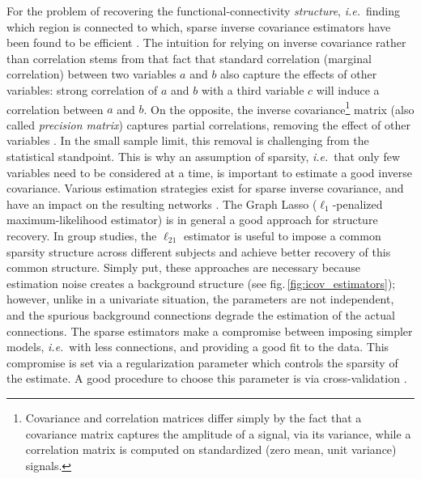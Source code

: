 \documentclass[5p]{elsarticle}
\begin{document}
For the problem of recovering the functional-connectivity
\emph{structure}, \emph{i.e.}\ finding which region is connected to
which, sparse inverse covariance estimators have been found to be
efficient \cite{varoquaux2010c,smith2011,ryali2012}. The intuition for relying on
inverse covariance rather than correlation stems from that fact that
standard correlation (marginal correlation) between two variables $a$ and
$b$ also capture the effects of other variables: strong correlation of
$a$ and $b$ with a third variable $c$ will induce a correlation between
$a$ and $b$. On the opposite, the inverse covariance\footnote{Covariance
and correlation matrices differ simply by the fact that a covariance
matrix captures the amplitude of a signal, via its variance, while a
correlation matrix is computed on standardized (zero mean, unit variance) signals.}
matrix (also called \emph{precision matrix}) captures
partial correlations, removing the effect of other variables
\cite{marrelec2006a}. In the small sample limit, this removal is
challenging from the statistical standpoint. This is why an assumption 
of sparsity,
\emph{i.e.}\ that only few variables need to be considered at a time, is
important to estimate a good inverse covariance. Various estimation
strategies exist for sparse inverse covariance, and have an impact on the
resulting networks \cite{varoquaux2012,varoquaux2010c}. The
Graph Lasso ($\ell_1$-penalized maximum-likelihood estimator)
\cite{friedman2008} is in general a good approach for structure recovery. In group studies,
the $\ell_{21}$ estimator \cite{varoquaux2010c,honorio2012} is useful to
impose a common sparsity structure across different subjects and achieve
better recovery of this common structure. Simply put, these approaches
are necessary because estimation noise creates a background structure
(see fig.\,\ref{fig:icov_estimators}); however, unlike in a univariate situation, the
parameters are not independent, and the spurious background connections
degrade the estimation of the actual connections. The sparse estimators
make a compromise between imposing simpler models, \emph{i.e.}\ with less
connections, and providing a good fit to the data. This compromise is set via a
regularization parameter which controls the sparsity of the estimate. A
good procedure to choose this parameter is via cross-validation
\cite{varoquaux2010c}.

\end{document}
